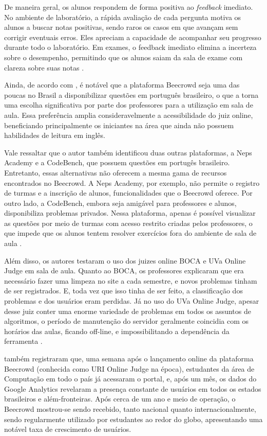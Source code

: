 De maneira geral, os alunos respondem de forma positiva ao \textit{feedback} imediato. No ambiente de laboratório, a rápida avaliação de cada pergunta motiva os alunos a buscar notas positivas, sendo raros os casos em que avançam sem corrigir eventuais erros. Eles apreciam a capacidade de acompanhar seu progresso durante todo o laboratório. Em exames, o feedback imediato elimina a incerteza sobre o desempenho, permitindo que os alunos saiam da sala de exame com clareza sobre suas notas \cite[p.~49]{lobbharlow}. 

Ainda, de acordo com \textcite[p.~24]{lima2023}, é notável que a plataforma Beecrowd seja uma das poucas no Brasil a disponibilizar questões em português brasileiro, o que a torna uma escolha significativa por parte dos professores para a utilização em sala de aula. Essa preferência amplia consideravelmente a acessibilidade do juiz online, beneficiando principalmente os iniciantes na área que ainda não possuem habilidades de leitura em inglês. 

Vale ressaltar que o autor também identificou duas outras plataformas, a Neps Academy e a CodeBench, que possuem questões em portugês brasileiro. Entretanto, essas alternativas não oferecem a mesma gama de recursos encontrados no Beecrowd. A Neps Academy, por exemplo, não permite o registro de turmas e a inscrição de alunos, funcionalidades que o Beecrowd oferece. Por outro lado, a CodeBench, embora seja amigável para professores e alunos, disponibiliza problemas privados. Nessa plataforma, apenas é possível visualizar as questões por meio de turmas com acesso restrito criadas pelos professores, o que impede que os alunos tentem resolver exercícios fora do ambiente de sala de aula \cite[p.~41]{lima2023}. 

Além disso, os autores \textcite[p.~41]{beztonin2012} testaram o uso dos juizes online BOCA e UVa Online Judge em sala de aula. Quanto ao BOCA, os professores explicaram que era necessário fazer uma limpeza no site a cada semestre, e novos problemas tinham de ser registrados. E, toda vez que isso tinha de ser feito, a classificação dos problemas e dos usuários eram perdidas. Já no uso do UVa Online Judge, apesar desse juiz conter uma enorme variedade de problemas em todos os assuntos de algoritmos, o período de manutenção do servidor geralmente coincidia com os horários das aulas, ficando off-line, e impossibilitando a dependência da ferramenta \cite[p.~1]{beztonin2012}. 

\textcite[p.~248]{beztonin2014} também registraram que, uma semana após o lançamento online da plataforma Beecrowd (conhecida como URI Online Judge na época), estudantes da área de Computação em todo o país já acessaram o portal, e, após um mês, os dados do Google Analytics revelaram a presença constante de usuários em todos os estados brasileiros e além-fronteiras. Após cerca de um ano e meio de operação, o Beecrowd mostrou-se sendo recebido, tanto nacional quanto internacionalmente, sendo regularmente utilizado por estudantes ao redor do globo, apresentando uma notável taxa de crescimento de usuários. 

